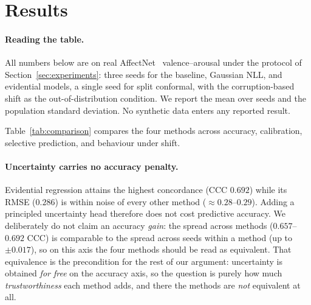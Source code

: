 \section{Results}
\label{sec:results}

\paragraph{Reading the table.} All numbers below are on real
AffectNet~\cite{mollahosseini2017affectnet} valence--arousal under the protocol of
Section~\ref{sec:experiments}: three seeds for the baseline, Gaussian NLL, and
evidential models, a single seed for split conformal, with the corruption-based
shift as the out-of-distribution condition. We report the mean over seeds and the
population standard deviation. No synthetic data enters any reported result.

Table~\ref{tab:comparison} compares the four methods across accuracy,
calibration, selective prediction, and behaviour under shift.

\begin{table}[h]
  \centering
  \small
  
  \caption{Method comparison on AffectNet-VA. Mean$_{\pm\text{std}}$ over three
  seeds ($1337/7/21$); $^{\ddagger}$conformal is a single seed and is reported
  without error bars. CCC: mean concordance over valence and arousal (higher
  better). RMSE: mean over both axes (lower better). ECE: regression calibration
  error (lower better). Sharp.: mean predictive interval width, informative
  only alongside ECE and therefore never ranked. AURC: area under the risk--coverage
  curve (lower better). OOD-AUROC: separation of clean from corrupted inputs by
  the uncertainty score (higher better). $\Delta$ECE: calibration degradation
  from clean to corrupted inputs; all uncertainty-aware methods lie within seed
  noise of zero, so this column is likewise not ranked. $^{\dagger}$The
  deterministic baseline emits no uncertainty, so its ECE, sharpness, OOD-AUROC
  and $\Delta$ECE are degenerate rather than competitive and are excluded from
  ranking. \textbf{Bold} marks the best value: over all methods for the accuracy
  columns, and over the uncertainty-aware methods elsewhere.}
  \label{tab:comparison}
\end{table}

\paragraph{Uncertainty carries no accuracy penalty.} Evidential regression attains
the highest concordance (CCC $0.692$) while its RMSE ($0.286$) is within noise of
every other method ($\approx 0.28$--$0.29$). Adding a principled uncertainty head
therefore does not cost predictive accuracy. We deliberately do not claim an
accuracy \emph{gain}: the spread across methods ($0.657$--$0.692$ CCC) is
comparable to the spread across seeds within a method (up to $\pm0.017$), so on
this axis the four methods should be read as equivalent. That equivalence is the
precondition for the rest of our argument: uncertainty is obtained
\emph{for free} on the accuracy axis, so the question is purely how much
\emph{trustworthiness} each method adds, and there the methods are \emph{not}
equivalent at all.


